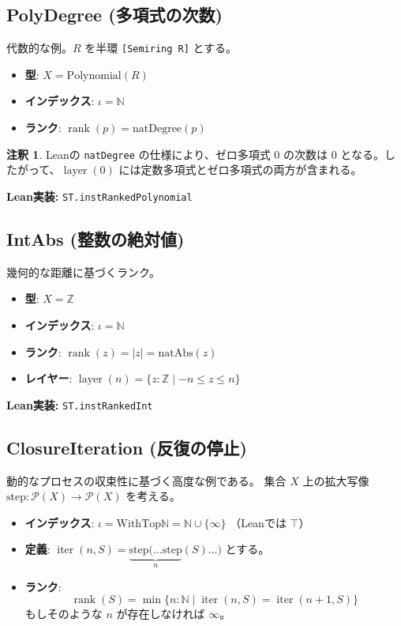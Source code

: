 \documentclass[a4paper,11pt]{article}
\theoremstyle{definition}
\newtheorem{remark}[definition]{注釈}
\theoremstyle{plain}
\newcommand{\code}[1]{\texttt{#1}}
\newcommand{\rank}{\operatorname{rank}}
\newcommand{\layer}{\operatorname{layer}}
\newcommand{\iter}{\operatorname{iter}}
\newcommand{\WithTop}{\mathrm{WithTop}}
\newcommand{\N}{\mathbb{N}}
\newcommand{\Z}{\mathbb{Z}}
\newcommand{\Poly}{\mathrm{Polynomial}}
\begin{document}
\subsection{PolyDegree (多項式の次数)}
代数的な例。$R$ を半環 \code{[Semiring R]} とする。
\begin{itemize}
    \item \textbf{型}: $X = \Poly(R)$
    \item \textbf{インデックス}: $\iota = \N$
    \item \textbf{ランク}: $\rank(p) = \mathrm{natDegree}(p)$
\end{itemize}
\begin{remark}
Leanの \code{natDegree} の仕様により、ゼロ多項式 $0$ の次数は $0$ となる。したがって、$\layer(0)$ には定数多項式とゼロ多項式の両方が含まれる。
\end{remark}
\noindent \textbf{Lean実装:} \code{ST.instRankedPolynomial}

\subsection{IntAbs (整数の絶対値)}
幾何的な距離に基づくランク。
\begin{itemize}
    \item \textbf{型}: $X = \Z$
    \item \textbf{インデックス}: $\iota = \N$
    \item \textbf{ランク}: $\rank(z) = |z| = \mathrm{natAbs}(z)$
    \item \textbf{レイヤー}: $\layer(n) = \{ z : \Z \mid -n \le z \le n \}$
\end{itemize}
\noindent \textbf{Lean実装:} \code{ST.instRankedInt}

\subsection{ClosureIteration (反復の停止)}
動的なプロセスの収束性に基づく高度な例である。
集合 $X$ 上の拡大写像 $\mathrm{step} : \mathcal{P}(X) \to \mathcal{P}(X)$ を考える。

\begin{itemize}
    \item \textbf{インデックス}: $\iota = \WithTop \N = \N \cup \{\infty\}$ （Leanでは $\top$）
    \item \textbf{定義}: $\iter(n, S) = \underbrace{\mathrm{step}(\dots \mathrm{step}}_{n}(S)\dots)$ とする。
    \item \textbf{ランク}: 
    \[ \rank(S) = \min \{ n : \N \mid \iter(n, S) = \iter(n+1, S) \} \]
    もしそのような $n$ が存在しなければ $\infty$。
\end{itemize}
\end{document}
